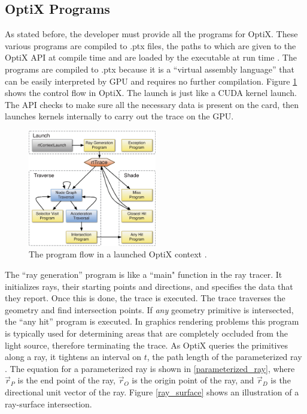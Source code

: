 \subsection{OptiX Programs}

As stated before, the developer must provide all the programs for OptiX.  These various programs are compiled to .ptx files, the paths to which are given to the OptiX API at compile time and are loaded by the executable at run time \cite{optix}.  The programs are compiled to .ptx because it is a ``virtual assembly language'' that can be easily interpreted by GPU and requires no further compilation.  Figure \ref{optix_flow} shows the control flow in OptiX.  The launch is just like a CUDA kernel launch.  The API checks to make sure all the necessary data is present on the card, then launches kernels internally to carry out the trace on the GPU.

\begin{figure}[h!] 
  \centering
    \includegraphics[width=0.5\textwidth]{graphics/optix_flow.eps}
     \caption[The program flow in a launched OptiX context.]{The program flow in a launched OptiX context \cite{optix_paper}. \label{optix_flow}}
\end{figure}

The ``ray generation'' program is like a ``main" function in the ray tracer. It initializes rays, their starting points and directions, and specifies the data that they report.  Once this is done, the trace is executed. The trace traverses the geometry and find intersection points.  If \emph{any} geometry primitive is intersected, the ``any hit'' program is executed.  In graphics rendering problems this program is typically used for determining areas that are completely occluded from the light source, therefore terminating the trace. %
  As OptiX queries the primitives along a ray, it tightens an interval on $t$, the path length of the parameterized ray \cite{optix}.  The equation for a parameterized ray is shown in \eqref{parameterized_ray}, where $\vec{r}_P$ is the end point of the ray, $\vec{r}_O$ is the origin point of the ray, and $\vec{r}_D$ is the directional unit vector of the ray.  Figure \ref{ray_surface} shows an illustration of a ray-surface intersection.

